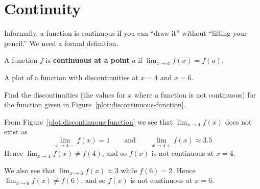 \section{Continuity}


Informally, a function is continuous if you can ``draw it'' without
``lifting your pencil.'' We need a formal definition.

\begin{definition} A function $f$ is \textbf{continuous
at a point} $a$ if $\lim_{x\to a} f(x) = f(a)$.  
\end{definition}
\begin{marginfigure}[0in]
\caption{A plot of a function with discontinuities at $x=4$ and $x=6$.}
\label{plot:discontinuous-function}
\end{marginfigure}

\begin{example}
Find the discontinuities (the values for $x$ where a function is not
continuous) for the function given in Figure~\ref{plot:discontinuous-function}.
\end{example}
\begin{solution}
From Figure~\ref{plot:discontinuous-function} we see that $\lim_{x\to 4} f(x)$ does not exist as
\[
\lim_{x\to 4-}f(x) = 1\qquad\text{and}\qquad \lim_{x\to 4+}f(x) \approx 3.5
\]
Hence $\lim_{x\to 4} f(x) \ne f(4)$, and so $f(x)$ is not
continuous at $x=4$.

We also see that $\lim_{x\to 6} f(x) \approx 3$ while $f(6) =
2$. Hence $\lim_{x\to 6} f(x) \ne f(6)$, and so $f(x)$ is not
continuous at $x=6$.
\end{solution}

